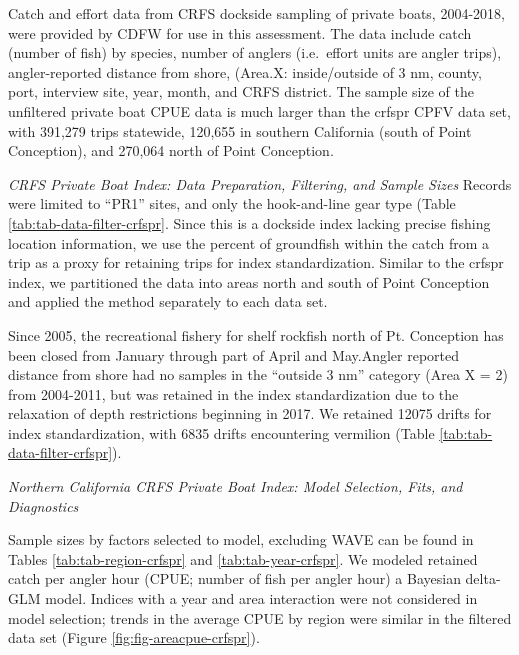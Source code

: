 \documentclass[
  english,
  a4paper,
]{article}
\begin{document}
Catch and effort data from CRFS dockside sampling of private boats, 2004-2018,
were provided by CDFW for use in this assessment. The data include catch (number
of fish) by species, number of anglers (i.e.~effort units are angler trips),
angler-reported distance from shore, (Area.X: inside/outside of 3 nm, county, port,
interview site, year, month, and CRFS district. The sample size of the
unfiltered private boat CPUE data is much larger than the crfspr CPFV data set,
with 391,279 trips statewide, 120,655 in southern California (south
of Point Conception), and 270,064 north of Point Conception.

\emph{CRFS Private Boat Index: Data Preparation, Filtering, and Sample Sizes}
Records were limited to ``PR1'' sites, and only the hook-and-line gear type
(Table \ref{tab:tab-data-filter-crfspr}.
Since this is a dockside index lacking precise fishing location information, we
use the percent of groundfish within the catch from a trip as a proxy for retaining
trips for index standardization. Similar to the crfspr index, we partitioned the
data into areas north and south of Point Conception and applied the method
separately to each data set.

Since 2005, the recreational fishery for shelf rockfish north of Pt. Conception
has been closed from January through part of April and May.Angler reported distance
from shore had no samples in the ``outside 3 nm'' category (Area X = 2)
from 2004-2011, but was retained in the index standardization due to the relaxation
of depth restrictions beginning in 2017. We retained 12075 drifts for index standardization, with 6835 drifts encountering vermilion
(Table \ref{tab:tab-data-filter-crfspr}).

\emph{Northern California CRFS Private Boat Index: Model Selection, Fits, and Diagnostics}

Sample sizes by factors selected to model, excluding WAVE can be found in Tables
\ref{tab:tab-region-crfspr} and \ref{tab:tab-year-crfspr}.
We modeled retained catch per angler hour (CPUE; number of fish per angler hour)
a Bayesian delta-GLM model. Indices with a year and area interaction were not
considered in model selection; trends in the average CPUE by region were similar
in the filtered data set (Figure \ref{fig:fig-areacpue-crfspr}).
\end{document}
